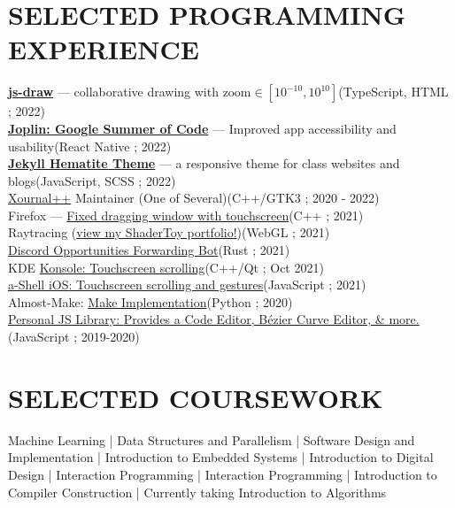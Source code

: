\documentclass[12pt,letterpaper]{extarticle}
\begin{document}
  \section{SELECTED PROGRAMMING EXPERIENCE}
  \newcommand\prExpEntry[3]{\textrm{#1}\hfill (#2 ; #3) \\}
  \prExpEntry{\textbf{\href{https://www.npmjs.com/package/js-draw}{js-draw}} — \small collaborative drawing with $\textrm{zoom} \in [10^{-10}, 10^{10}]$}{TypeScript, HTML}{2022}
  \prExpEntry{\textbf{\href{https://henry-heino.web.app/2022/09/05/gsoc-final-reflection/}{Joplin: Google Summer of Code}} — \footnotesize Improved app accessibility and usability}{\small React Native}{2022}
  \prExpEntry{\textbf{\href{https://personalizedrefrigerator.github.io/jekyll-hematite-theme/}{Jekyll Hematite Theme}} — \footnotesize a responsive theme for class websites and blogs}{\small JavaScript, SCSS }{2022}
  \prExpEntry{\href{https://github.com/xournalpp/xournalpp}{Xournal++} Maintainer (One of Several)}{C++/GTK3}{2020 - 2022}
  \prExpEntry{Firefox --- \href{https://phabricator.services.mozilla.com/D129349}{Fixed dragging window with touchscreen}}{C++}{2021}
  \prExpEntry{Raytracing (\href{https://shadertoy.com/user/personalizedrefrigerator}{view my ShaderToy portfolio!})}{WebGL}{2021}
  \prExpEntry{\href{https://github.com/UWAppDev/opportunities-forwarding-bot}{Discord Opportunities Forwarding Bot}}{Rust}{2021}
  \prExpEntry{KDE \href{https://invent.kde.org/utilities/konsole/-/merge_requests/516}{Konsole: Touchscreen scrolling}}{C++/Qt}{Oct 2021}
  \prExpEntry{\href{https://github.com/holzschu/a-shell/pull/246}{{a-Shell iOS}: Touchscreen scrolling and gestures}}{JavaScript}{2021}
  \prExpEntry{Almost-Make: \href{https://github.com/personalizedrefrigerator/AlmostMake}{Make Implementation}}{Python}{2020}
  \prExpEntry{\href{https://github.com/personalizedrefrigerator/LibJS}{{\footnotesize Personal JS Library:} {\small Provides a Code Editor, Bézier Curve Editor, \& more.}}}{JavaScript}{2019-2020}

  \section{SELECTED COURSEWORK}
  \begin{addmargin}[2em]{2em}
    \def\cseRf#1#2{{#2}}
    \def\cseSp{ | }
    \small

    \cseRf{446}{Machine Learning}
    \cseSp{}\cseRf{332}{Data Structures and Parallelism}
    \cseSp{}\cseRf{331}{Software Design and Implementation}
    \cseSp{}\cseRf{474}{Introduction to Embedded Systems}
    \cseSp{}\cseRf{369}{Introduction to Digital Design}
    \cseSp{}\cseRf{340}{Interaction Programming}
    \cseSp{}\cseRf{340}{Interaction Programming}
    \cseSp{}\cseRf{401}{Introduction to Compiler Construction}
    \cseSp{} Currently taking \cseRf{421}{Introduction to Algorithms}
  \end{addmargin}
\end{document}
